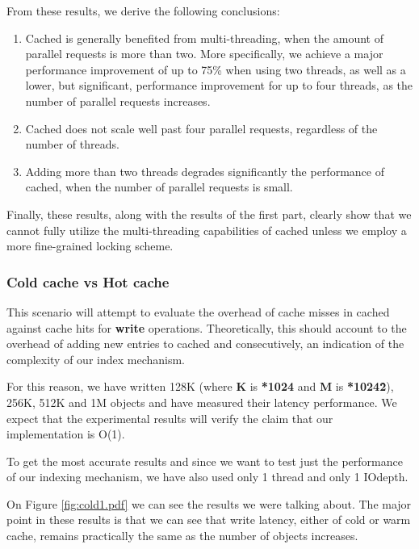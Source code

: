 
From these results, we derive the following conclusions:

\begin{enumerate}
	\item Cached is generally benefited from multi-threading, when the amount 
		of parallel requests is more than two. More specifically, we achieve a 
		major performance improvement of up to 75\% when using two threads, as 
		well as a lower, but significant, performance improvement for up to 
		four threads, as the number of parallel requests increases.
	\item Cached does not scale well past four parallel requests, regardless of 
		the number of threads.
	\item Adding more than two threads degrades significantly the performance 
		of cached, when the number of parallel requests is small.
\end{enumerate}

Finally, these results, along with the results of the first part, clearly show 
that we cannot fully utilize the multi-threading capabilities of cached unless 
we employ a more fine-grained locking scheme.

\subsubsection{Cold cache vs Hot cache}

This scenario will attempt to evaluate the overhead of cache misses in cached
against cache hits for \textbf{write} operations. Theoretically, this should 
account to the overhead of adding new entries to cached and consecutively, an 
indication of the complexity of our index mechanism.

For this reason, we have written 128K (where \textbf{K} is \textbf{*1024} and 
\textbf{M} is \textbf{*1024\^2}), 256K, 512K and 1M objects and have measured 
their latency performance. We expect that the experimental results will verify 
the claim that our implementation is O(1).

To get the most accurate results and since we want to test just the performance 
of our indexing mechanism, we have also used only 1 thread and only 1 IOdepth. 

On Figure \ref{fig:cold1.pdf} we can see the results we were talking about. The 
major point in these results is that we can see that write latency, either of 
cold or warm cache, remains practically the same as the number of objects 
increases.

